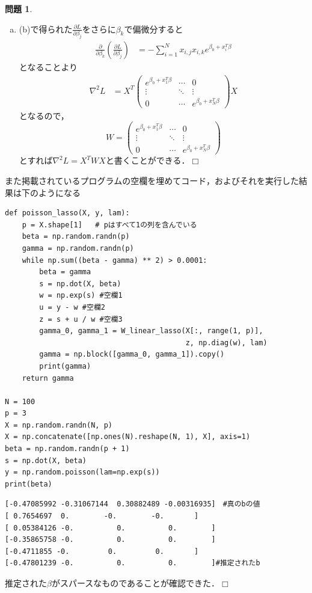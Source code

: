 \documentclass[titlepage]{jsarticle}
\theoremstyle{definition}
\newtheorem{Ex}{問題}
\theoremstyle{mystyle} %
\renewcommand{\footnotesize}{\normalsize}
\def\qed{\hfill$\Box$}
\begin{document}
\begin{Ex}
\begin{enumerate}[(a)]
\item (b)で得られた$\frac{\partial L}{\partial \beta_j}$をさらに$\beta_k$で偏微分すると
\begin{align*}
\frac{\partial }{\partial \beta_k}\left(\frac{\partial L}{\partial \beta_j}\right)&=-\sum_{i=1}^N x_{i,j}x_{i,k}e^{\beta_0+x_i^T \beta}
\end{align*}
となることより
\begin{align*}
\nabla^2 L &=X^T \begin{pmatrix}
e^{\beta_0+x_1^T \beta} & \cdots & 0\\
\vdots & \ddots & \vdots \\
0 & \cdots & e^{\beta_0+x_N^T \beta}
\end{pmatrix}X
\end{align*}
となるので，
$$W = \begin{pmatrix}
e^{\beta_0+x_1^T \beta} & \cdots & 0\\
\vdots & \ddots & \vdots \\
0 & \cdots & e^{\beta_0+x_N^T \beta}
\end{pmatrix}$$
とすれば$\nabla^2 L =X^TWX$と書くことができる．\qed\\
\end{enumerate}
また掲載されているプログラムの空欄を埋めてコード，およびそれを実行した結果は下のようになる
\begin{lstlisting}[basicstyle = \ttfamily\footnotesize, frame = single]
def poisson_lasso(X, y, lam):
    p = X.shape[1]   # pはすべて1の列を含んでいる
    beta = np.random.randn(p)
    gamma = np.random.randn(p)
    while np.sum((beta - gamma) ** 2) > 0.0001:
        beta = gamma
        s = np.dot(X, beta)
        w = np.exp(s) #空欄1
        u = y - w #空欄2
        z = s + u / w #空欄3
        gamma_0, gamma_1 = W_linear_lasso(X[:, range(1, p)],
                                          z, np.diag(w), lam)
        gamma = np.block([gamma_0, gamma_1]).copy()
        print(gamma)
    return gamma

N = 100    
p = 3
X = np.random.randn(N, p)
X = np.concatenate([np.ones(N).reshape(N, 1), X], axis=1)
beta = np.random.randn(p + 1)
s = np.dot(X, beta)
y = np.random.poisson(lam=np.exp(s))
print(beta)
\end{lstlisting}
\begin{lstlisting}[basicstyle = \ttfamily\footnotesize, frame = single]
[-0.47085992 -0.31067144  0.30882489 -0.00316935]　#真のbの値
[ 0.7654697  0.        -0.        -0.       ]
[ 0.05384126 -0.          0.          0.        ]
[-0.35865758 -0.          0.          0.        ]
[-0.4711855 -0.         0.         0.       ]
[-0.47801239 -0.          0.          0.        ]#推定されたb
\end{lstlisting}
推定された$\beta$がスパースなものであることが確認できた．\qed\\

\end{Ex}
\end{document}
